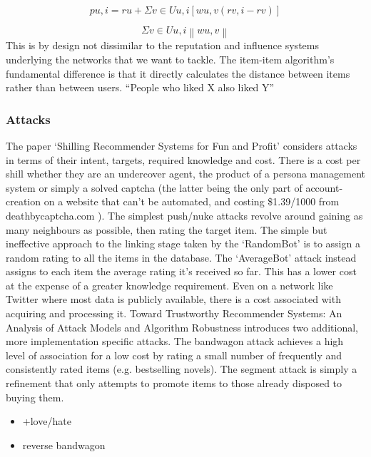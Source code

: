 \begin{equation*}
pu,i = ru + \Sigma v \in Uu,i [wu,v (rv,i − rv)]
\end{equation*}

\begin{equation*}
\Sigma v \in Uu,i \left\|wu,v \right\|
\end{equation*}
This is by design not dissimilar to the reputation and influence systems
underlying the networks that we want to tackle. The item-item algorithm's
fundamental difference is that it directly calculates the distance between items
rather than between users. ``People who liked X also liked Y''

\subsubsection{Attacks}

The paper `Shilling Recommender Systems for Fun and Profit' considers attacks in terms of their intent, targets, required knowledge and cost. There is a cost per shill whether they are an undercover agent, the product of a persona management system or simply a solved captcha (the latter being the only part of account-creation on a website that can't be automated, and costing \$1.39/1000 from deathbycaptcha.com ). The simplest push/nuke attacks revolve around gaining as many neighbours as possible, then rating the target item. The simple but ineffective approach to the linking stage taken by the `RandomBot' is to assign a random rating to all the items in the database. The `AverageBot' attack instead assigns to each item the average rating it's received so far. This has a lower cost at the expense of a greater knowledge requirement. Even on a network like Twitter where most data is publicly available, there is a cost associated with acquiring and processing it. Toward Trustworthy Recommender Systems: An Analysis of Attack Models and Algorithm Robustness introduces two additional, more implementation specific attacks. The bandwagon attack achieves a high level of association for a low cost by rating a small number of frequently and consistently rated items (e.g. bestselling novels).  The segment attack is simply a refinement that only attempts to promote items to those already disposed to buying them.

\begin{itemize}
	\item +love/hate
	\item reverse bandwagon
\end{itemize}

